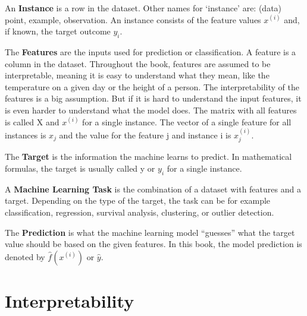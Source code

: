 \documentclass[
  10pt,
]{scrbook}
\begin{document}
An \textbf{Instance} is a row in the dataset.
Other names for `instance' are: (data) point, example, observation.
An instance consists of the feature values \(x^{(i)}\) and, if known, the target outcome \(y_i\).

The \textbf{Features} are the inputs used for prediction or classification.
A feature is a column in the dataset.
Throughout the book, features are assumed to be interpretable, meaning it is easy to understand what they mean, like the temperature on a given day or the height of a person.
The interpretability of the features is a big assumption.
But if it is hard to understand the input features, it is even harder to understand what the model does.
The matrix with all features is called X and \(x^{(i)}\) for a single instance.
The vector of a single feature for all instances is \(x_j\) and the value for the feature j and instance i is \(x^{(i)}_j\).

The \textbf{Target} is the information the machine learns to predict.
In mathematical formulas, the target is usually called y or \(y_i\) for a single instance.

A \textbf{Machine Learning Task} is the combination of a dataset with features and a target.
Depending on the type of the target, the task can be for example classification, regression, survival analysis, clustering, or outlier detection.

The \textbf{Prediction} is what the machine learning model ``guesses'' what the target value should be based on the given features.
In this book, the model prediction is denoted by \(\hat{f}(x^{(i)})\) or \(\hat{y}\).

\hypertarget{interpretability}{%
\chapter{Interpretability}\label{interpretability}}
\end{document}
